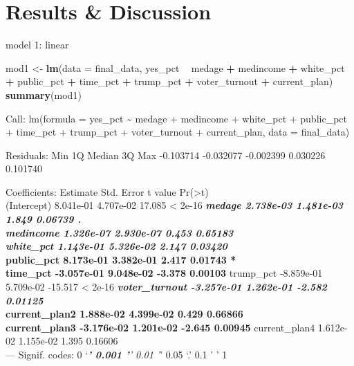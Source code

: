 \documentclass[
]{article}
\newenvironment{Shaded}{\begin{snugshade}}{\end{snugshade}}
\newcommand{\DataTypeTok}[1]{\textcolor[rgb]{0.13,0.29,0.53}{#1}}
\newcommand{\KeywordTok}[1]{\textcolor[rgb]{0.13,0.29,0.53}{\textbf{#1}}}
\newcommand{\NormalTok}[1]{#1}
\newcommand{\OperatorTok}[1]{\textcolor[rgb]{0.81,0.36,0.00}{\textbf{#1}}}
\newcommand{\StringTok}[1]{\textcolor[rgb]{0.31,0.60,0.02}{#1}}
\begin{document}
\hypertarget{results-discussion}{%
\section{Results \& Discussion}\label{results-discussion}}

model 1: linear

\begin{Shaded}
\begin{Highlighting}[]
\NormalTok{mod1 <-}\StringTok{ }\KeywordTok{lm}\NormalTok{(}\DataTypeTok{data =}\NormalTok{ final_data, yes_pct }\OperatorTok{~}\StringTok{ }\NormalTok{medage }\OperatorTok{+}\StringTok{ }\NormalTok{medincome }\OperatorTok{+}\StringTok{ }\NormalTok{white_pct }
           \OperatorTok{+}\StringTok{ }\NormalTok{public_pct }\OperatorTok{+}\StringTok{ }\NormalTok{time_pct }\OperatorTok{+}\StringTok{ }\NormalTok{trump_pct }\OperatorTok{+}\StringTok{ }\NormalTok{voter_turnout }\OperatorTok{+}
\StringTok{              }\NormalTok{current_plan)}
\KeywordTok{summary}\NormalTok{(mod1)}
\end{Highlighting}
\end{Shaded}

Call: lm(formula = yes\_pct \textasciitilde{} medage + medincome +
white\_pct + public\_pct + time\_pct + trump\_pct + voter\_turnout +
current\_plan, data = final\_data)

Residuals: Min 1Q Median 3Q Max -0.103714 -0.032077 -0.002399 0.030226
0.101740

Coefficients: Estimate Std. Error t value
Pr(\textgreater\textbar t\textbar)\\
(Intercept) 8.041e-01 4.707e-02 17.085 \textless{} 2e-16 \textbf{\emph{
medage 2.738e-03 1.481e-03 1.849 0.06739 .\\
medincome 1.326e-07 2.930e-07 0.453 0.65183\\
white\_pct 1.143e-01 5.326e-02 2.147 0.03420 }\\
public\_pct 8.173e-01 3.382e-01 2.417 0.01743 *\\
time\_pct -3.057e-01 9.048e-02 -3.378 0.00103 } trump\_pct -8.859e-01
5.709e-02 -15.517 \textless{} 2e-16 \textbf{\emph{ voter\_turnout
-3.257e-01 1.262e-01 -2.582 0.01125 }\\
current\_plan2 1.888e-02 4.399e-02 0.429 0.66866\\
current\_plan3 -3.176e-02 1.201e-02 -2.645 0.00945 } current\_plan4
1.612e-02 1.155e-02 1.395 0.16606\\
--- Signif. codes: 0 `\emph{\textbf{' 0.001 '}' 0.01 '}' 0.05 `.' 0.1 '
' 1
\end{document}
